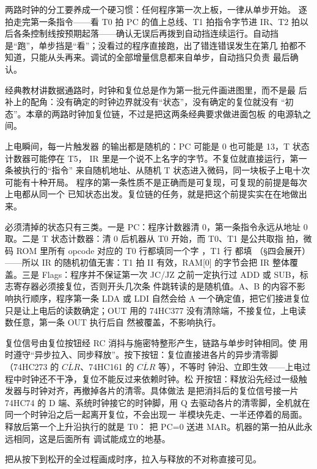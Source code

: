 两路时钟的分工要养成一个硬习惯：任何程序第一次上板，一律从单步开始。
逐拍走完第一条指令——看 T0 拍 PC 的值上总线、T1 拍指令字节进 IR、T2
拍以后各条控制线按预期起落——确认无误后再拨到自动挡连续运行。自动挡
是“跑”，单步挡是“看”；没看过的程序直接跑，出了错连错误发生在第几
拍都不知道，只能从头再来。调试的全部增量信息都来自单步，自动挡只负责
最后确认。

\begin{classicnote}
经典教材讲数据通路时，时钟和复位总是作为第一批元件画进图里，而不是最
后补上的配角：没有确定的时钟边界就没有“状态”，没有确定的复位就没有
“初态”。本章的两路时钟加复位链，不过是把这两条经典要求做进面包板
的电源轨之间。
\end{classicnote}

上电瞬间，每一片触发器
的输出都是随机的：PC 可能是 0 也可能是 13，T 状态计数器可能停在 T5，
IR 里是一个说不上名字的字节。不复位就直接运行，第一条被执行的“指令”
来自随机地址、从随机 T 状态进入微码，同一块板子上电十次可能有十种开局。
程序的第一条性质不是正确而是可复现，可复现的前提是每次上电都从同一个
已知状态出发。复位链的任务，就是把这个前提实实在在地做出来。

必须清掉的状态只有三类。一是 PC：程序计数器清 0，第一条指令永远从地址
0 取。二是 T 状态计数器：清 0 后机器从 T0 开始，而 T0、T1 是公共取指
拍，微码 ROM 里所有 opcode 对应的 T0 行都填同一个字 ，T1 行
都填 （§四会展开）——所以 IR 的随机初值无害：T1 拍 II
有效，RAM[0] 的字节会把 IR 整体覆盖。三是 Flags：程序并不保证第一次
JC/JZ 之前一定执行过 ADD 或 SUB，标志寄存器必须接复位，否则开头几次条
件跳转读的是随机值。A、B 的内容不影响执行顺序，程序第一条 LDA 或
LDI 自然会给 A 一个确定值，把它们接进复位只是让上电后的读数确定；OUT
用的 74HC377 没有清除端，不接复位，上电读数任意，第一条 OUT 执行后自
然被覆盖，不影响执行。

复位信号由复位按钮经 RC 消抖与施密特整形产生，链路与单步时钟相同。使
用时遵守“异步拉入、同步释放”。按下按钮：复位直接进各片的异步清零脚
（74HC273 的 $\overline{CLR}$、74HC161 的 $\overline{CLR}$ 等），不等时
钟沿、立即生效——上电过程中时钟还不干净，复位不能反过来依赖时钟。松
开按钮：释放沿先经过一级触发器与时钟对齐，再撤掉各片的清零。具体做法
是把消抖后的复位信号接一片 74HC74 的 D 端、系统时钟接它的时钟脚，用 Q
去驱动各片的清零脚，全机就在同一个时钟沿之后一起离开复位，不会出现一
半模块先走、一半还停着的局面。释放后第一个上升沿执行的就是 T0：
 把 PC=0 送进 MAR。机器的第一拍从此永远相同，这是后面所有
调试能成立的地基。

把从按下到松开的全过程画成时序，拉入与释放的不对称直接可见。

